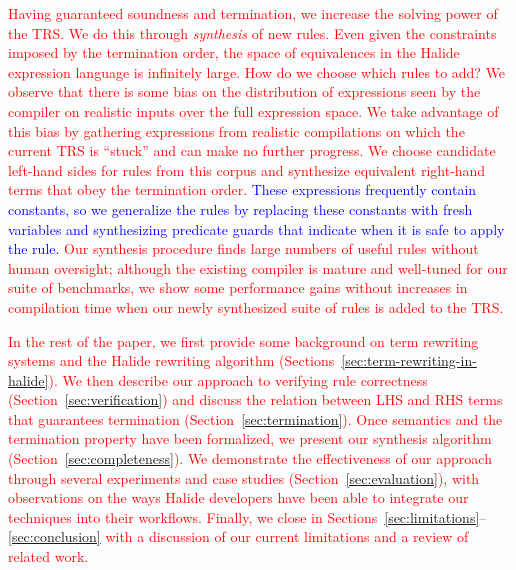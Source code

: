 \documentclass[acmsmall,review]{acmart}\settopmatter{printfolios=true,printccs=false,printacmref=false}
\newcommand{\modified}[1]{\textcolor{red}{{#1}}}
\newcommand{\modifiedagain}[1]{\textcolor{blue}{{#1}}}
\begin{document}
\modified{Having guaranteed soundness and termination, we increase 
the solving power of the TRS. We do this through \emph{synthesis} of new rules. Even
given the constraints imposed by the termination order, the space of equivalences 
in the Halide expression language is infinitely large. How do we choose which  
rules to add? We observe that there is some bias on the distribution of expressions 
seen by the compiler on realistic inputs over the full expression space. We take advantage 
of this bias by gathering expressions from realistic compilations on which the current 
TRS is ``stuck'' and can make no further progress. We choose candidate left-hand sides 
for rules from this corpus and synthesize equivalent right-hand terms that obey the 
termination order. \modifiedagain{These expressions frequently contain constants, so we
generalize the rules by replacing these constants
with fresh variables and synthesizing predicate guards that indicate when it is safe to apply 
the rule.} Our synthesis procedure finds large numbers of useful rules without
human oversight; although the existing compiler is mature 
and well-tuned for our suite of benchmarks, we show some performance 
gains without increases in compilation time when our newly synthesized suite 
of rules is added to the TRS. }


\modified{In the rest of the paper, we first provide some background on term rewriting systems 
and the Halide rewriting algorithm (Sections~\ref{sec:term-rewriting-in-halide}).
We then describe our approach to verifying
rule correctness (Section~\ref{sec:verification}) and discuss the relation between LHS and RHS terms that guarantees 
termination (Section~\ref{sec:termination}). Once semantics and the termination property have been formalized, 
we present our synthesis algorithm (Section~\ref{sec:completeness}). We demonstrate the effectiveness of our approach 
through several experiments and case studies (Section~\ref{sec:evaluation}), with observations on the ways Halide developers 
have been able to integrate our techniques into their workflows. Finally, we close in Sections~\ref{sec:limitations}--\ref{sec:conclusion}
 with a discussion of our current limitations and a review of related work.}
\end{document}
